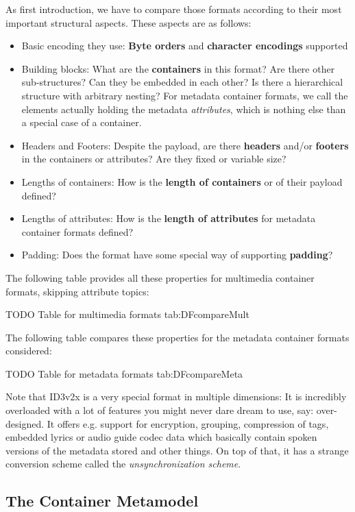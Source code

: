 As first introduction, we have to compare those formats according to their most important structural aspects. These aspects are as follows:
\begin{itemize}
\item Basic encoding they use: \textbf{Byte orders} and \textbf{character encodings} supported
\item Building blocks: What are the \textbf{containers} in this format? Are there other sub-structures? Can they be embedded in each other? Is there a hierarchical structure with arbitrary nesting? For metadata container formats, we call the elements actually holding the metadata \emph{attributes}, which is nothing else than a special case of a container.
\item Headers and Footers: Despite the payload, are there \textbf{headers} and/or \textbf{footers} in the containers or attributes? Are they fixed or variable size?
\item Lengths of containers: How is the \textbf{length of containers} or of their payload defined?
\item Lengths of attributes: How is the \textbf{length of attributes} for metadata container formats defined?
\item Padding: Does the format have some special way of supporting \textbf{padding}?
\end{itemize}

The following table provides all these properties for multimedia container formats, skipping attribute topics:

TODO Table for multimedia formats
tab:DFcompareMult

The following table compares these properties for the metadata container formats considered:

TODO Table for metadata formats
tab:DFcompareMeta

Note that ID3v2x is a very special format in multiple dimensions: It is incredibly overloaded with a lot of features you might never dare dream to use, say: over-designed. It offers e.g. support for encryption, grouping, compression of tags, embedded lyrics or audio guide codec data which basically contain spoken versions of the metadata stored and other things. On top of that, it has a strange conversion scheme called the \emph{unsynchronization scheme}. 

\subsection{The Container Metamodel}%
\label{sec:TheContainerMetamodel}%

